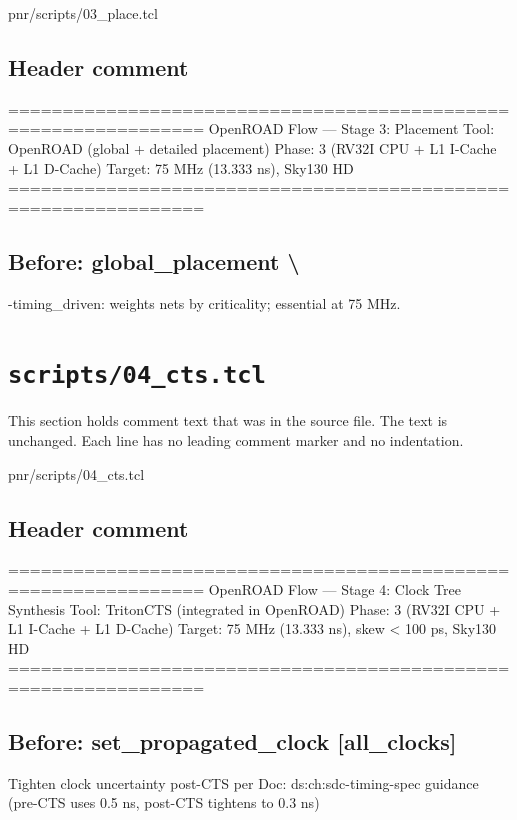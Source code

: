 \begin{relocated}{pnr/scripts/03_place.tcl}

\subsection*{Header comment}

\begin{textblock}
================================================================
OpenROAD Flow — Stage 3: Placement
Tool: OpenROAD (global + detailed placement)
Phase: 3 (RV32I CPU + L1 I-Cache + L1 D-Cache)
Target: 75 MHz (13.333 ns), Sky130 HD
================================================================
\end{textblock}

\subsection*{Before: global\_placement \textbackslash{}}

\begin{textblock}
-timing_driven: weights nets by criticality; essential at 75 MHz.
\end{textblock}

\end{relocated}

\section{\texttt{scripts/04\_cts.tcl}}\label{tm:pd:scripts-04-cts-tcl}

This section holds comment text that was in the source file. The text is unchanged. Each line has no leading comment marker and no indentation.

\begin{relocated}{pnr/scripts/04_cts.tcl}

\subsection*{Header comment}

\begin{textblock}
================================================================
OpenROAD Flow — Stage 4: Clock Tree Synthesis
Tool: TritonCTS (integrated in OpenROAD)
Phase: 3 (RV32I CPU + L1 I-Cache + L1 D-Cache)
Target: 75 MHz (13.333 ns), skew < 100 ps, Sky130 HD
================================================================
\end{textblock}

\subsection*{Before: set\_propagated\_clock [all\_clocks]}

\begin{textblock}
Tighten clock uncertainty post-CTS per Doc: ds:ch:sdc-timing-spec guidance
(pre-CTS uses 0.5 ns, post-CTS tightens to 0.3 ns)
\end{textblock}

\end{relocated}

